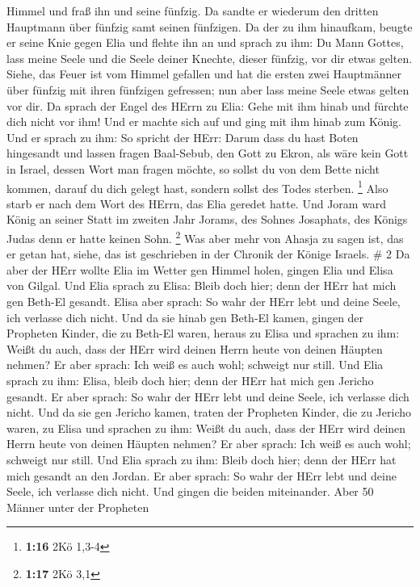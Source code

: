Himmel und fraß ihn und seine fünfzig.  Da sandte er
wiederum den dritten Hauptmann über fünfzig samt seinen fünfzigen. Da
der zu ihm hinaufkam, beugte er seine Knie gegen Elia und flehte ihn an
und sprach zu ihm: Du Mann Gottes, lass meine Seele und die Seele deiner
Knechte, dieser fünfzig, vor dir etwas gelten.  Siehe, das
Feuer ist vom Himmel gefallen und hat die ersten zwei Hauptmänner über
fünfzig mit ihren fünfzigen gefressen; nun aber lass meine Seele etwas
gelten vor dir.  Da sprach der Engel des HErrn zu Elia:
Gehe mit ihm hinab und fürchte dich nicht vor ihm! Und er machte sich
auf und ging mit ihm hinab zum König.  Und er sprach zu
ihm: So spricht der HErr: Darum dass du hast Boten hingesandt und lassen
fragen Baal-Sebub, den Gott zu Ekron, als wäre kein Gott in Israel,
dessen Wort man fragen möchte, so sollst du von dem Bette nicht kommen,
darauf du dich gelegt hast, sondern sollst des Todes sterben.
\footnote{\textbf{1:16} 2Kö 1,3-4}  Also starb er nach dem
Wort des HErrn, das Elia geredet hatte. Und Joram ward König an seiner
Statt im zweiten Jahr Jorams, des Sohnes Josaphats, des Königs Judas
denn er hatte keinen Sohn. \footnote{\textbf{1:17} 2Kö 3,1}
 Was aber mehr von Ahasja zu sagen ist, das er getan hat,
siehe, das ist geschrieben in der Chronik der Könige Israels. \# 2
 Da aber der HErr wollte Elia im Wetter gen Himmel holen,
gingen Elia und Elisa von Gilgal.  Und Elia sprach zu Elisa:
Bleib doch hier; denn der HErr hat mich gen Beth-El gesandt. Elisa aber
sprach: So wahr der HErr lebt und deine Seele, ich verlasse dich nicht.
Und da sie hinab gen Beth-El kamen,  gingen der Propheten
Kinder, die zu Beth-El waren, heraus zu Elisa und sprachen zu ihm: Weißt
du auch, dass der HErr wird deinen Herrn heute von deinen Häupten
nehmen? Er aber sprach: Ich weiß es auch wohl; schweigt nur still.
 Und Elia sprach zu ihm: Elisa, bleib doch hier; denn der
HErr hat mich gen Jericho gesandt. Er aber sprach: So wahr der HErr lebt
und deine Seele, ich verlasse dich nicht. Und da sie gen Jericho kamen,
 traten der Propheten Kinder, die zu Jericho waren, zu Elisa
und sprachen zu ihm: Weißt du auch, dass der HErr wird deinen Herrn
heute von deinen Häupten nehmen? Er aber sprach: Ich weiß es auch wohl;
schweigt nur still.  Und Elia sprach zu ihm: Bleib doch
hier; denn der HErr hat mich gesandt an den Jordan. Er aber sprach: So
wahr der HErr lebt und deine Seele, ich verlasse dich nicht. Und gingen
die beiden miteinander.  Aber 50 Männer unter der Propheten
